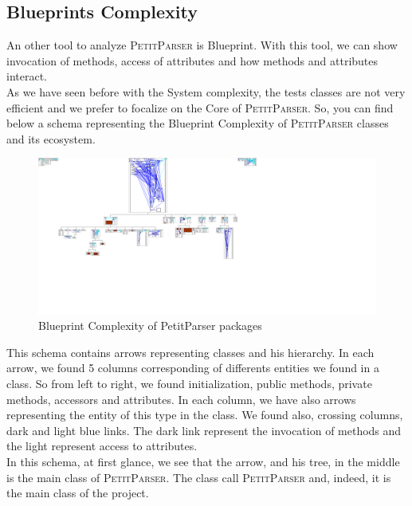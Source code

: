 \subsection{Blueprints Complexity}
An other tool to analyze \textsc{PetitParser} is Blueprint.  With this tool, we can show invocation of methods, access of attributes and how methods and attributes interact.\\
As we have seen before with the System complexity, the tests classes are not very efficient and we prefer to focalize on the Core of \textsc{PetitParser}.  So, you can find below a schema representing the Blueprint Complexity of \textsc{PetitParser} classes and its ecosystem.\\
\begin{figure}[ht]
\label{blueprint_system}
\includegraphics[scale=0.35]{blueprint_petit_parser.png}
\caption{Blueprint Complexity of PetitParser packages}
\end{figure}
This schema contains arrows representing classes and his hierarchy.  In each arrow, we found 5 columns corresponding of differents entities we found in a class.  So from left to right, we found initialization, public methods, private methods, accessors and attributes.  In each column, we have also arrows representing the entity of this type in the class.  We found also, crossing columns, dark and light blue links.  The dark link represent the invocation of methods and the light represent access to attributes.\\

In this schema, at first glance, we see that the arrow, and his tree, in the middle is the main class of \textsc{PetitParser}.  The class call \textsc{PetitParser} and, indeed, it is the main class of the project. \\

